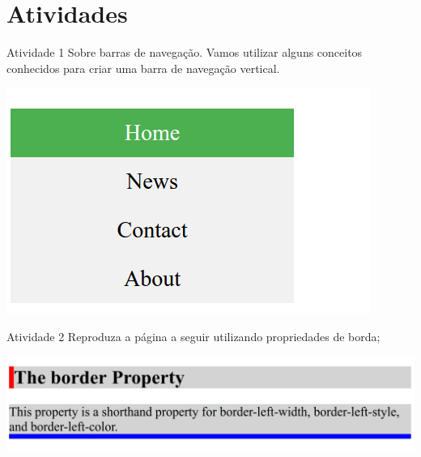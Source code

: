 \documentclass{beamer}
\begin{document}
\section{Atividades}
\begin{frame}{Atividade 1}
Sobre barras de navegação. Vamos utilizar alguns conceitos conhecidos para criar uma barra de navegação 
vertical.
	\begin{center}
		  \includegraphics[height=0.4\paperheight]{fig/aula2/aep_1_2.png} \\
	  \end{center}
\end{frame}
\begin{frame}{Atividade 2}
Reproduza a página a seguir utilizando propriedades de borda;
  \begin{center}
    \includegraphics[height=0.2\paperheight]{fig/aula2/AEP_1_1.png} \\
  \end{center}
\end{frame}

\end{document}
